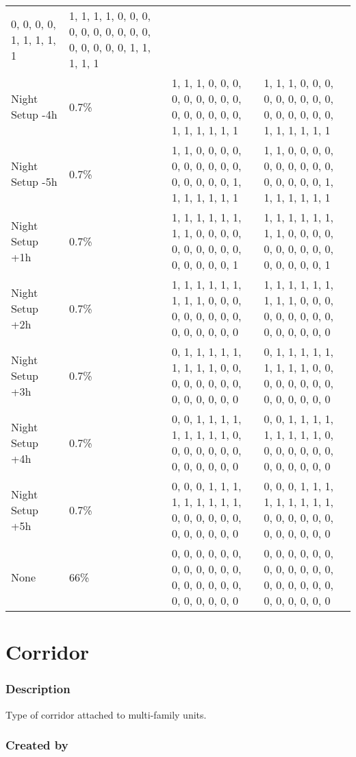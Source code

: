 \begin{longtable}[]{@{}llll@{}}
0, 0, 0, 0, 1, 1, 1, 1, 1 & 1, 1, 1, 1, 0, 0, 0, 0, 0, 0, 0, 0, 0, 0, 0,
0, 0, 0, 0, 1, 1, 1, 1, 1 \\
Night Setup -4h & 0.7\% & 1, 1, 1, 0, 0, 0, 0, 0, 0, 0, 0, 0, 0, 0, 0,
0, 0, 0, 1, 1, 1, 1, 1, 1 & 1, 1, 1, 0, 0, 0, 0, 0, 0, 0, 0, 0, 0, 0, 0,
0, 0, 0, 1, 1, 1, 1, 1, 1 \\
Night Setup -5h & 0.7\% & 1, 1, 0, 0, 0, 0, 0, 0, 0, 0, 0, 0, 0, 0, 0,
0, 0, 1, 1, 1, 1, 1, 1, 1 & 1, 1, 0, 0, 0, 0, 0, 0, 0, 0, 0, 0, 0, 0, 0,
0, 0, 1, 1, 1, 1, 1, 1, 1 \\
Night Setup +1h & 0.7\% & 1, 1, 1, 1, 1, 1, 1, 1, 0, 0, 0, 0, 0, 0, 0,
0, 0, 0, 0, 0, 0, 0, 0, 1 & 1, 1, 1, 1, 1, 1, 1, 1, 0, 0, 0, 0, 0, 0, 0,
0, 0, 0, 0, 0, 0, 0, 0, 1 \\
Night Setup +2h & 0.7\% & 1, 1, 1, 1, 1, 1, 1, 1, 1, 0, 0, 0, 0, 0, 0,
0, 0, 0, 0, 0, 0, 0, 0, 0 & 1, 1, 1, 1, 1, 1, 1, 1, 1, 0, 0, 0, 0, 0, 0,
0, 0, 0, 0, 0, 0, 0, 0, 0 \\
Night Setup +3h & 0.7\% & 0, 1, 1, 1, 1, 1, 1, 1, 1, 1, 0, 0, 0, 0, 0,
0, 0, 0, 0, 0, 0, 0, 0, 0 & 0, 1, 1, 1, 1, 1, 1, 1, 1, 1, 0, 0, 0, 0, 0,
0, 0, 0, 0, 0, 0, 0, 0, 0 \\
Night Setup +4h & 0.7\% & 0, 0, 1, 1, 1, 1, 1, 1, 1, 1, 1, 0, 0, 0, 0,
0, 0, 0, 0, 0, 0, 0, 0, 0 & 0, 0, 1, 1, 1, 1, 1, 1, 1, 1, 1, 0, 0, 0, 0,
0, 0, 0, 0, 0, 0, 0, 0, 0 \\
Night Setup +5h & 0.7\% & 0, 0, 0, 1, 1, 1, 1, 1, 1, 1, 1, 1, 0, 0, 0,
0, 0, 0, 0, 0, 0, 0, 0, 0 & 0, 0, 0, 1, 1, 1, 1, 1, 1, 1, 1, 1, 0, 0, 0,
0, 0, 0, 0, 0, 0, 0, 0, 0 \\
None & 66\% & 0, 0, 0, 0, 0, 0, 0, 0, 0, 0, 0, 0, 0, 0, 0, 0, 0, 0, 0,
0, 0, 0, 0, 0 & 0, 0, 0, 0, 0, 0, 0, 0, 0, 0, 0, 0, 0, 0, 0, 0, 0, 0, 0,
0, 0, 0, 0, 0 \\
\end{longtable}

\section{Corridor}\label{corridor}

\subsubsection{Description}\label{description-26}

Type of corridor attached to multi-family units.

\subsubsection{Created by}\label{created-by-26}

